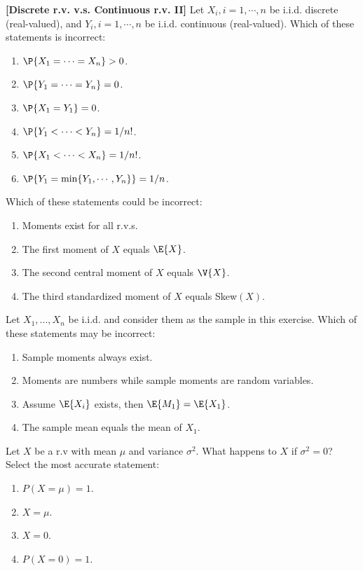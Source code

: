 \documentclass[poll_tutorial_format]{subfiles}
\begin{document}
		
				\begin{exercise}
			\textbf{[Discrete r.v. v.s. Continuous r.v. II]}
			Let $X_i, i=1,\cdots, n$ be i.i.d. discrete (real-valued), and $Y_i, i=1,\cdots, n$ be i.i.d. continuous (real-valued).
			Which of these statements is incorrect: 
			\begin{enumerate}
				\item $\P{X_1=\cdots =X_n}>0$.
				\item $\P{Y_1=\cdots =Y_n}=0$.
				\item $\P{X_1=Y_1}=0$.
				\item $\P{Y_1<\cdots <Y_n}=1/n!$.
				\item $\P{X_1<\cdots <X_n}=1/n!$.
				\item $\P{Y_1=\min\{Y_1, \cdots, Y_n\}}=1/n$.  
			\end{enumerate}
		\end{exercise}
		
	
	\begin{exercise}
		Which of these statements could be incorrect:
		\begin{enumerate}
			\item Moments exist for all r.v.s.
			\item The first moment of $X$ equals $\E{X}$.
			\item The second central moment of $X$ equals $\V{X}$.
			\item The third standardized moment of $X$ equals Skew$(X)$. 
		\end{enumerate}
	\end{exercise}
	
	
	\begin{exercise}
		Let $X_1, . . . ,X_n$ be i.i.d. and consider them as the sample in this exercise.
		Which of these statements may be incorrect: 
		\begin{enumerate}
			\item Sample moments always exist.
			\item Moments are numbers while sample moments are random variables.
			\item Assume $\E{X_i}$ exists, then $\E{M_1}=\E{X_1}$.
			\item The sample mean equals the mean of $X_1$. 
		\end{enumerate}
	\end{exercise}
	
	
			\begin{exercise}
		Let $X$ be a r.v with mean $\mu$ and variance $\sigma^2$. What happens to $X$ if $\sigma^2 =0$? Select the most accurate statement:
		\begin{enumerate}
			\item $P{(X=\mu)}=1$. 
			\item $X=\mu$.			
			\item $X=0$.			
			\item $P{(X=0)}=1$.			
		\end{enumerate}
	\end{exercise}
	
\end{document}
